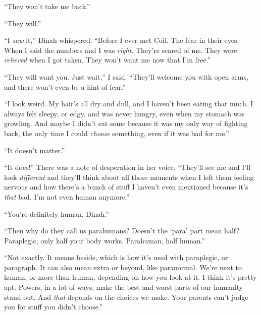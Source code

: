 





``They won't take me back.''



``They will.''



``I \emph{saw} it,'' Dinah whispered.  ``Before I ever met Coil.  The fear in their eyes.  When I said the numbers and I was \emph{right}.  They're scared of me.  They were \emph{relieved} when I got taken.  They won't want me now that I'm free.''



``They will want you.  Just wait,'' I said.  ``They'll welcome you with open arms, and there won't even be a hint of fear.''



``I look weird.  My hair's all dry and dull, and I haven't been eating that much.  I always felt sleepy, or edgy, and was never hungry, even when my stomach was growling.  And maybe I didn't eat some because it was my only way of fighting back, the only time I could \emph{choose} something, even if it was bad for me.''



``It doesn't matter.''



``It does!''  There was a note of desperation in her voice.  ``They'll see me and I'll look \emph{different} and they'll think about all those moments when I left them feeling nervous and how there's a bunch of stuff I haven't even mentioned because it's \emph{that} bad.  I'm not even human anymore.''



``You're definitely human, Dinah.''



``Then why do they call us parahumans?  Doesn't the `para' part mean half?  Paraplegic, only half your body works.  Parahuman, half human.''



``Not exactly.  It means beside, which is how it's used with paraplegic, or paragraph.  It can also mean extra or beyond, like paranormal.  We're next to human, or more than human, depending on how you look at it.  I think it's pretty apt.  Powers, in a lot of ways, make the best and worst parts of our humanity stand out.  And \emph{that} depends on the choices we make.  Your parents can't judge you for stuff you didn't choose.''



